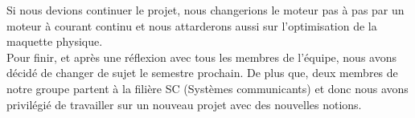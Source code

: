 \documentclass[oneside,a4paper,12pt]{article}
\begin{document}
	Si nous devions continuer le projet, nous changerions le moteur pas à pas par un moteur à courant continu et nous attarderons aussi sur l'optimisation de la maquette physique.\\

	Pour finir, et après une réflexion avec tous les membres de l’équipe, nous avons décidé de changer de sujet le semestre prochain. De plus que, deux membres de notre groupe partent à la filière SC (Systèmes communicants) et donc nous avons privilégié de travailler sur un nouveau projet avec des nouvelles notions.
\end{document}
